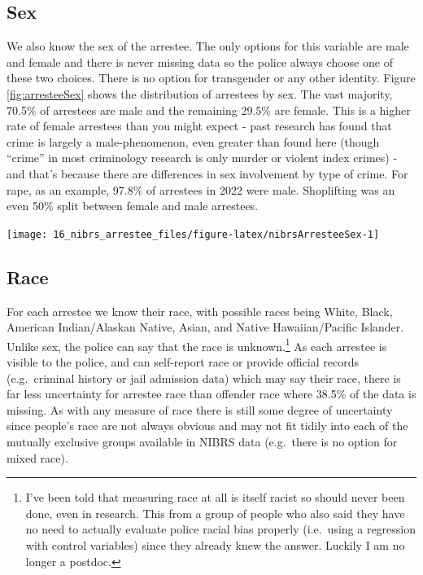 \documentclass[
]{krantz}
\let\origfigure\figure
\let\endorigfigure\endfigure
\renewenvironment{figure}[1][2] {
    \expandafter\origfigure\expandafter[H]
} {
    \endorigfigure
}
\begin{document}
\subsection{Sex}\label{sex-3}

We also know the sex of the arrestee. The only options for
this variable are male and female and there is never missing
data so the police always choose one of these two choices.
There is no option for transgender or any other identity.
Figure \ref{fig:arresteeSex} shows the distribution of
arrestees by sex. The vast majority, 70.5\% of arrestees are
male and the remaining 29.5\% are female. This is a higher
rate of female arrestees than you might expect - past
research has found that crime is largely a male-phenomenon,
even greater than found here (though ``crime'' in most
criminology research is only murder or violent index crimes)
- and that's because there are differences in sex
involvement by type of crime. For rape, as an example,
97.8\% of arrestees in 2022 were male. Shoplifting was an
even 50\% split between female and male arrestees.

\begin{figure}

{\centering \texttt{[image: 16\_nibrs\_arrestee\_files/figure-latex/nibrsArresteeSex-1]} 

}

\caption{The share of arrestees by sex, 1991-2022.}\label{fig:nibrsArresteeSex}
\end{figure}

\subsection{Race}\label{race-4}

For each arrestee we know their race, with possible races
being White, Black, American Indian/Alaskan Native, Asian,
and Native Hawaiian/Pacific Islander. Unlike sex, the police
can say that the race is unknown.\footnote{I've been told
  that measuring race at all is itself racist so should
  never been done, even in research. This from a group of
  people who also said they have no need to actually
  evaluate police racial bias properly (i.e.~using a
  regression with control variables) since they already knew
  the answer. Luckily I am no longer a postdoc.} As each
arrestee is visible to the police, and can self-report race
or provide official records (e.g.~criminal history or jail
admission data) which may say their race, there is far less
uncertainty for arrestee race than offender race where
38.5\% of the data is missing. As with any measure of race
there is still some degree of uncertainty since people's
race are not always obvious and may not fit tidily into each
of the mutually exclusive groups available in NIBRS data
(e.g.~there is no option for mixed race).
\end{document}
